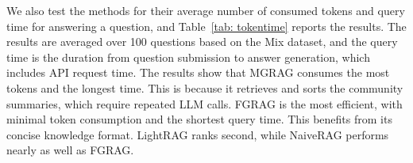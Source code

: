  We also test the methods for their average number of consumed tokens and query time for answering a question, and Table~\ref{tab: tokentime} reports the results. The results are averaged over 100 questions based on the Mix dataset, and the query time is the duration from question submission to answer generation, which includes API request time. The results show that MGRAG consumes the most tokens and the longest time. This is because it retrieves and sorts the community summaries, which require repeated LLM calls. FGRAG is the most efficient, with minimal token consumption and the shortest query time. This benefits from its concise knowledge format. LightRAG ranks second, while NaiveRAG performs nearly as well as FGRAG.